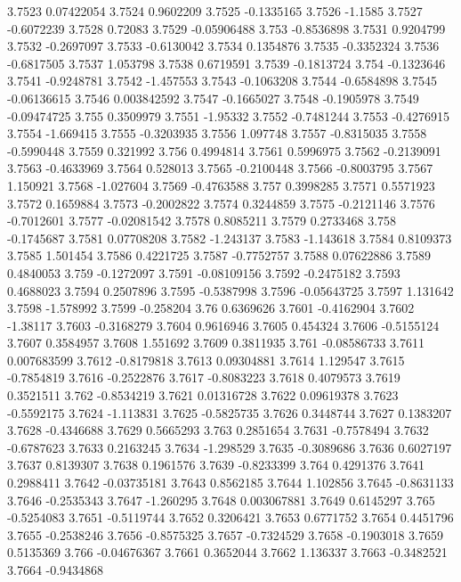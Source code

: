 3.7523  0.07422054
3.7524  0.9602209
3.7525  -0.1335165
3.7526  -1.1585
3.7527  -0.6072239
3.7528  0.72083
3.7529  -0.05906488
3.753  -0.8536898
3.7531  0.9204799
3.7532  -0.2697097
3.7533  -0.6130042
3.7534  0.1354876
3.7535  -0.3352324
3.7536  -0.6817505
3.7537  1.053798
3.7538  0.6719591
3.7539  -0.1813724
3.754  -0.1323646
3.7541  -0.9248781
3.7542  -1.457553
3.7543  -0.1063208
3.7544  -0.6584898
3.7545  -0.06136615
3.7546  0.003842592
3.7547  -0.1665027
3.7548  -0.1905978
3.7549  -0.09474725
3.755  0.3509979
3.7551  -1.95332
3.7552  -0.7481244
3.7553  -0.4276915
3.7554  -1.669415
3.7555  -0.3203935
3.7556  1.097748
3.7557  -0.8315035
3.7558  -0.5990448
3.7559  0.321992
3.756  0.4994814
3.7561  0.5996975
3.7562  -0.2139091
3.7563  -0.4633969
3.7564  0.528013
3.7565  -0.2100448
3.7566  -0.8003795
3.7567  1.150921
3.7568  -1.027604
3.7569  -0.4763588
3.757  0.3998285
3.7571  0.5571923
3.7572  0.1659884
3.7573  -0.2002822
3.7574  0.3244859
3.7575  -0.2121146
3.7576  -0.7012601
3.7577  -0.02081542
3.7578  0.8085211
3.7579  0.2733468
3.758  -0.1745687
3.7581  0.07708208
3.7582  -1.243137
3.7583  -1.143618
3.7584  0.8109373
3.7585  1.501454
3.7586  0.4221725
3.7587  -0.7752757
3.7588  0.07622886
3.7589  0.4840053
3.759  -0.1272097
3.7591  -0.08109156
3.7592  -0.2475182
3.7593  0.4688023
3.7594  0.2507896
3.7595  -0.5387998
3.7596  -0.05643725
3.7597  1.131642
3.7598  -1.578992
3.7599  -0.258204
3.76  0.6369626
3.7601  -0.4162904
3.7602  -1.38117
3.7603  -0.3168279
3.7604  0.9616946
3.7605  0.454324
3.7606  -0.5155124
3.7607  0.3584957
3.7608  1.551692
3.7609  0.3811935
3.761  -0.08586733
3.7611  0.007683599
3.7612  -0.8179818
3.7613  0.09304881
3.7614  1.129547
3.7615  -0.7854819
3.7616  -0.2522876
3.7617  -0.8083223
3.7618  0.4079573
3.7619  0.3521511
3.762  -0.8534219
3.7621  0.01316728
3.7622  0.09619378
3.7623  -0.5592175
3.7624  -1.113831
3.7625  -0.5825735
3.7626  0.3448744
3.7627  0.1383207
3.7628  -0.4346688
3.7629  0.5665293
3.763  0.2851654
3.7631  -0.7578494
3.7632  -0.6787623
3.7633  0.2163245
3.7634  -1.298529
3.7635  -0.3089686
3.7636  0.6027197
3.7637  0.8139307
3.7638  0.1961576
3.7639  -0.8233399
3.764  0.4291376
3.7641  0.2988411
3.7642  -0.03735181
3.7643  0.8562185
3.7644  1.102856
3.7645  -0.8631133
3.7646  -0.2535343
3.7647  -1.260295
3.7648  0.003067881
3.7649  0.6145297
3.765  -0.5254083
3.7651  -0.5119744
3.7652  0.3206421
3.7653  0.6771752
3.7654  0.4451796
3.7655  -0.2538246
3.7656  -0.8575325
3.7657  -0.7324529
3.7658  -0.1903018
3.7659  0.5135369
3.766  -0.04676367
3.7661  0.3652044
3.7662  1.136337
3.7663  -0.3482521
3.7664  -0.9434868
